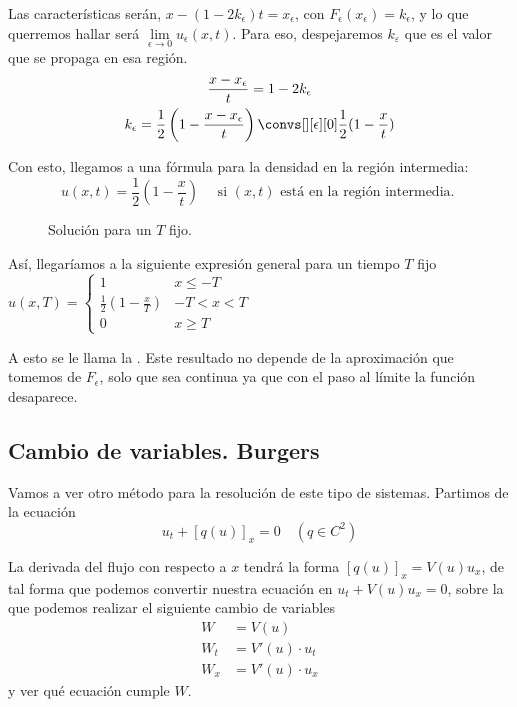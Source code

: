 \begin{example}
				Las características serán,  $x - (1-2k_\epsilon) t = x_\epsilon$, con $F_\epsilon(x_\epsilon) = k_\epsilon$, y lo que querremos hallar será $\lim\limits_{\epsilon \rightarrow 0} u_\epsilon(x,t)$. Para eso, despejaremos $k_ε$ que es el valor que se propaga en esa región.
				\begin{gather*}
				\frac{x - x_\epsilon}{t} = 1-2k_\epsilon \\
				k_\epsilon = \frac{1}{2} \left(1 - \frac{x-x_\epsilon}{t}\right) \convs[][\epsilon][0] \frac{1}{2} (1 - \frac{x}{t})
				\end{gather*}

				Con esto, llegamos a una fórmula para la densidad en la región intermedia:
				\[ u(x,t) = \frac{1}{2} (1 - \frac{x}{t}) \quad \text{ si } (x,t) \text{ está en la región intermedia. } \]

				\begin{figure}[hbtp]
					\centering
					\caption{Solución para un $T$ fijo.}
					\label{fig:SolucionTFijo}
				\end{figure}

				Así, llegaríamos a la siguiente expresión general para un tiempo $T$ fijo
				\( u(x,T) =
				\begin{cases}
					1 & x \leq -T \\
					\frac{1}{2} \left(1 - \frac{x}{T}\right) & -T < x < T \\
					0 & x \geq T
				\end{cases} \label{eq:SolucionRarefaccion}
				\)

				A esto se le llama la . Este resultado no depende de la aproximación que tomemos de $F_\epsilon$, solo que sea continua ya que con el paso al límite la función desaparece.
			\end{example}


	\subsection{Cambio de variables. Burgers}

		Vamos a ver otro método para la resolución de este tipo de sistemas. Partimos de la ecuación
		\[ u_t + [q(u)]_x = 0 \quad (q \in C^2) \]

		La derivada del flujo con respecto a $x$ tendrá la forma $[q(u)]_x = V(u) u_x$, de tal forma que podemos convertir nuestra ecuación en \(
		u_t + V(u)u_x = 0 \label{eq:burgers1} \), sobre la que podemos realizar el siguiente cambio de variables
		\begin{align*}
		W &= V(u) \\
		W_t &= V'(u) \cdot u_t \\
		W_x &= V'(u) \cdot u_x
		\end{align*} y ver qué ecuación cumple $W$.

